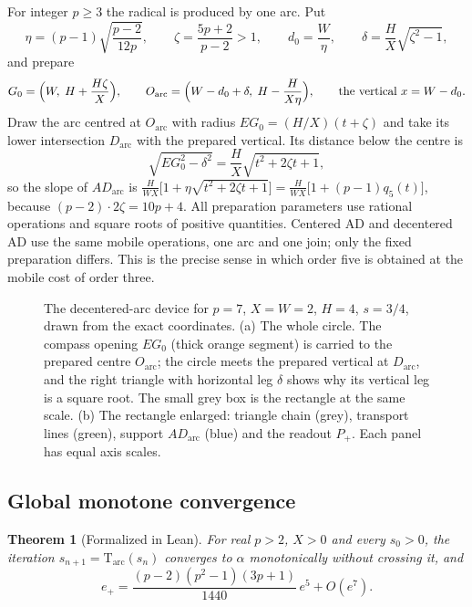 \documentclass[10pt,a4paper]{article}
\theoremstyle{plain}
\newtheorem{theorem}{Theorem}[section]
\theoremstyle{remark}
\numberwithin{equation}{section}
\newcommand{\Tm}{\mathrm{T}}
\begin{document}
For integer $p\ge3$ the radical is produced by one arc. Put
\[ \eta=(p-1)\sqrt{\frac{p-2}{12p}},\qquad \zeta=\frac{5p+2}{p-2}>1,\qquad d_0=\frac{W}{\eta},\qquad
\delta=\frac{H}{X}\sqrt{\zeta^{2}-1}, \]
and prepare
\[ G_0=\Bigl(W,\;H+\frac{H\zeta}{X}\Bigr),\qquad
O_{\mathrm{arc}}=\Bigl(W-d_0+\delta,\;H-\frac{H}{X\eta}\Bigr),\qquad\text{the vertical } x=W-d_0 . \]
Draw the arc centred at $O_{\mathrm{arc}}$ with radius $EG_0=(H/X)(t+\zeta)$ and take its lower
intersection $D_{\mathrm{arc}}$ with the prepared vertical. Its distance below the centre is
\[ \sqrt{EG_0^{2}-\delta^{2}}=\frac{H}{X}\sqrt{t^{2}+2\zeta t+1}, \]
so the slope of $AD_{\mathrm{arc}}$ is $\tfrac{H}{WX}\bigl[1+\eta\sqrt{t^{2}+2\zeta t+1}\bigr]
=\tfrac{H}{WX}\bigl[1+(p-1)q_5(t)\bigr]$, because $(p-2)\cdot2\zeta=10p+4$. All preparation parameters
use rational operations and square roots of positive quantities. Centered AD and decentered AD use the
same mobile operations, one arc and one join; only the fixed preparation differs. This is the precise
sense in which order five is obtained at the mobile cost of order three.

\begin{figure}[h]
\centering\figDecentered
\caption{The decentered-arc device for $p=7$, $X=W=2$, $H=4$, $s=3/4$, drawn from the exact coordinates.
(a) The whole circle. The compass opening $EG_0$ (thick orange segment) is carried to the prepared centre
$O_{\mathrm{arc}}$; the circle meets the prepared vertical at $D_{\mathrm{arc}}$, and the right triangle with
horizontal leg $\delta$ shows why its vertical leg is a square root. The small grey box is the rectangle
at the same scale. (b) The rectangle enlarged: triangle chain (grey), transport lines (green), support
$AD_{\mathrm{arc}}$ (blue) and the readout $P_+$. Each panel has equal axis scales.}\label{fig:arc}
\end{figure}

\subsection{Global monotone convergence}

\begin{theorem}[Formalized in Lean]\label{thm:arc}
For real $p>2$, $X>0$ and every $s_0>0$, the iteration $s_{n+1}=\Tm_{\mathrm{arc}}(s_n)$ converges to
$\alpha$ monotonically without crossing it, and
\begin{equation}\label{eq:arc-order}
e_+=\frac{(p-2)(p^{2}-1)(3p+1)}{1440}\,e^{5}+O(e^{7}).
\end{equation}
\end{theorem}
\end{document}
